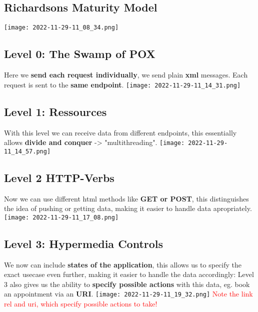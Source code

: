 \documentclass[main.tex,fontsize=6pt,paper=a4,paper=landscape,DIV=calc,]{scrartcl}
\begin{document}
\begin{multicols*}{4}
\subsection{Richardsons Maturity Model}  
\texttt{[image: 2022-11-29-11\_08\_34.png]}

\subsection{Level 0: The Swamp of POX}  
Here we \textbf{send each request individually}, we send plain \textbf{xml} messages.\newline
Each request is sent to the \textbf{same endpoint}. 
\texttt{[image: 2022-11-29-11\_14\_31.png]}


\subsection{Level 1: Ressources}  
With this level we can receive data from different endpoints, this essentially allows \textbf{divide and conquer} -> "multithreading".\newline 
\texttt{[image: 2022-11-29-11\_14\_57.png]}

\subsection{Level 2 HTTP-Verbs}  
Now we can use different html methods like \textbf{GET or POST}, this distinguishes the idea of pushing or getting data, making it easier to handle data apropriately. \newline
\texttt{[image: 2022-11-29-11\_17\_08.png]}

\subsection{Level 3: Hypermedia Controls}  
We now can include \textbf{states of the application}, this allows us to specify the exact usecase even further, making it easier to handle the data accordingly:\newline
Level 3 also gives us the ability to \textbf{specify possible actions} with this data, eg. book an appointment via an \textbf{URI}.
\texttt{[image: 2022-11-29-11\_19\_32.png]} \newline
\textcolor{red}{Note the link rel and uri, which specify possible actions to take!}


\end{multicols*}
\end{document}
